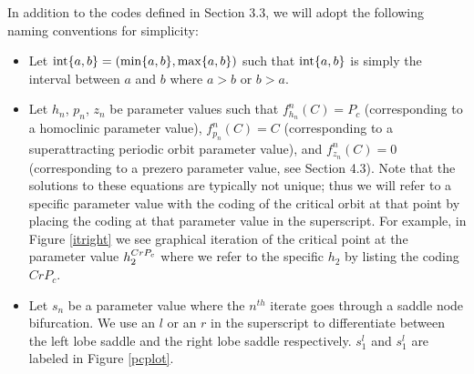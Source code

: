 	In addition to the codes defined in Section 3.3, we will adopt the following naming conventions for simplicity:
	\begin{itemize}
		\item Let $\text{int}\{a,b\} = (\min\{a,b\}, \max\{a,b\})$ such that $\text{int}\{a,b\}$ is simply the interval between $a$ and $b$ where $a > b$ or $b > a$.
		\item Let $h_n$, $p_n$, $z_n$ be parameter values such that $f^n_{h_n} (C) = P_c$ (corresponding to a homoclinic parameter value), $f^n_{p_n} (C) = C$ (corresponding to a superattracting periodic orbit parameter value), and $f^n_{z_n} (C) = 0$ (corresponding to a prezero parameter value, see Section 4.3). Note that the solutions to these equations are typically not unique; thus we will refer to a specific parameter value with the coding of the critical orbit at that point by placing the coding at that parameter value in the superscript. For example, in Figure \ref{itright} we see graphical iteration of the critical point at the parameter value $h^{CrP_c}_2$ where we refer to the specific $h_2$ by listing the coding $CrP_c$.
		\item Let $s_n$ be a parameter value where the $n^{th}$ iterate goes through a saddle node bifurcation. We use an $l$ or an $r$ in the superscript to differentiate between the left lobe saddle and the right lobe saddle respectively. $s_1^l$ and $s_1^l$ are labeled in Figure \ref{pcplot}.
	\end{itemize}
